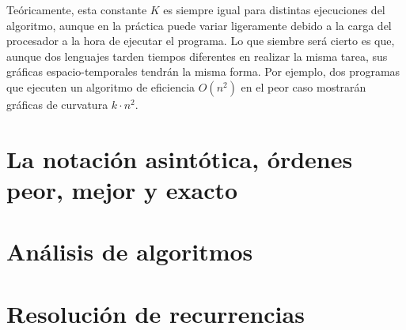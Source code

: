 Teóricamente, esta constante $K$ es siempre igual para distintas ejecuciones del algoritmo, aunque en la práctica puede variar ligeramente debido a la carga del procesador a la hora de ejecutar el programa.
Lo que siembre será cierto es que, aunque dos lenguajes tarden tiempos diferentes en realizar la misma tarea, sus gráficas espacio-temporales tendrán la misma forma.
Por ejemplo, dos programas que ejecuten un algoritmo de eficiencia $O(n^2)$ en el peor caso mostrarán gráficas de curvatura $k\cdot n^2$.

\section{La notación asintótica, órdenes peor, mejor y exacto}

\section{Análisis de algoritmos}

\section{Resolución de recurrencias}
